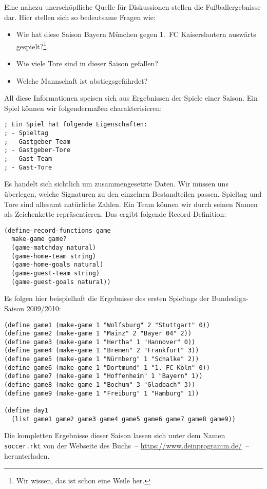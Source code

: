 Eine nahezu unerschöpfliche Quelle für Diskussionen stellen die
Fußballergebnisse dar.  Hier stellen sich so bedeutsame Fragen wie:
\begin{itemize}
\item Wie hat diese Saison Bayern München gegen 1.~FC Kaiserslautern
  auswärts gespielt?\footnote{Wir wissen, das ist schon eine Weile her.}
\item Wie viele Tore sind in dieser Saison gefallen?
\item Welche Mannschaft ist abstiegsgefährdet?
\end{itemize}
%
All diese Informationen speisen sich aus Ergebnissen der Spiele einer
Saison.  Ein Spiel können wir folgendermaßen charakterisieren:
%
\begin{lstlisting}
; Ein Spiel hat folgende Eigenschaften:
; - Spieltag
; - Gastgeber-Team
; - Gastgeber-Tore
; - Gast-Team
; - Gast-Tore
\end{lstlisting}
%
Es handelt sich sichtlich um zusammengesetzte Daten.  Wir müssen uns
überlegen, welche Signaturen zu den einzelnen Bestandteilen passen.
Spieltag und Tore sind allesamt natürliche Zahlen.  Ein Team können
wir durch seinen Namen als Zeichenkette repräsentieren.   Das ergibt
folgende Record-Definition:
\begin{lstlisting}
(define-record-functions game
  make-game game?
  (game-matchday natural)
  (game-home-team string)
  (game-home-goals natural)
  (game-guest-team string)
  (game-guest-goals natural))
\end{lstlisting}
%
Es folgen hier beispielhaft die Ergebnisse des ersten Spieltags der Bundesliga-Saison
2009/2010:
\begin{lstlisting}
(define game1 (make-game 1 "Wolfsburg" 2 "Stuttgart" 0))
(define game2 (make-game 1 "Mainz" 2 "Bayer 04" 2))
(define game3 (make-game 1 "Hertha" 1 "Hannover" 0))
(define game4 (make-game 1 "Bremen" 2 "Frankfurt" 3))
(define game5 (make-game 1 "Nürnberg" 1 "Schalke" 2))
(define game6 (make-game 1 "Dortmund" 1 "1. FC Köln" 0))
(define game7 (make-game 1 "Hoffenheim" 1 "Bayern" 1))
(define game8 (make-game 1 "Bochum" 3 "Gladbach" 3))
(define game9 (make-game 1 "Freiburg" 1 "Hamburg" 1))

(define day1
  (list game1 game2 game3 game4 game5 game6 game7 game8 game9))
\end{lstlisting}
%
Die kompletten Ergebnisse dieser Saison lassen sich unter dem Namen
\texttt{soccer.rkt} von der Webseite des Buchs~--
\url{https://www.deinprogramm.de/}~-- herunterladen.


